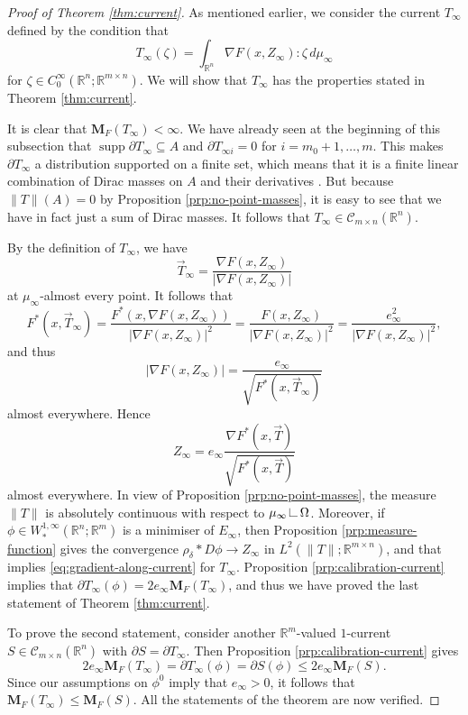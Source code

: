 \documentclass[a4paper]{article}
\newcommand{\R}{\mathbb{R}}
\newcommand{\M}{\mathbf{M}}
\newcommand{\grad}{\nabla}
\newcommand{\ncrt}{\mathcal{C}}
\DeclareMathOperator{\supp}{supp}
\newcommand{\restr}{\mathchoice
{\kern2pt\mbox{\vrule width 0.08ex height1.5ex depth0ex\kern-0.08ex\vrule width 1.5ex height.08ex depth0ex}\kern2pt}
{\kern2pt\mbox{\vrule width 0.08ex height1.5ex depth0ex\kern-0.08ex\vrule width 1.5ex height.08ex depth0ex}\kern2pt}
{\kern1.5pt\mbox{\vrule width 0.06ex height1.1ex depth0ex\kern-0.06ex\vrule width 1.1ex height.06ex depth0ex}\kern1.5pt}
{\kern1pt\mbox{\vrule width 0.04ex height0.75ex depth0ex\kern-0.04ex\vrule width 0.75ex height.04ex depth0ex}\kern1pt}
}
\theoremstyle{definition}
\theoremstyle{remark}
\begin{document}
\begin{proof}[Proof of Theorem \ref{thm:current}]
As mentioned earlier, we consider the current $T_\infty$ defined by the
condition that
\[
T_\infty(\zeta) = \int_{\R^n} \grad F(x, Z_\infty) : \zeta \, d\mu_\infty
\]
for $\zeta \in C_0^\infty(\R^n; \R^{m \times n})$. We will show that $T_\infty$
has the properties stated in Theorem \ref{thm:current}.

It is clear that $\M_F(T_\infty) < \infty$.
We have already seen at the beginning of this subsection that
$\supp \partial T_\infty \subseteq A$ and $\partial T_{\infty i} = 0$ for
$i = m_0 + 1, \dotsc, m$. This makes $\partial T_\infty$ a distribution
supported on a finite set, which means that it is a finite linear combination
of Dirac masses on $A$ and their derivatives \cite[Theorem 1.5.3]{Hoermander:64}.
But because $\|T\|(A) = 0$ by Proposition \ref{prp:no-point-masses}, it is easy to see that we have in fact
just a sum of Dirac masses. It follows that $T_\infty \in \ncrt_{m \times n}(\R^n)$.

By the definition of $T_\infty$, we have
\[
\vec{T}_\infty = \frac{\grad F(x, Z_\infty)}{|\grad F(x, Z_\infty)|}
\]
at $\mu_\infty$-almost every point. It follows that
\[
F^*(x, \vec{T}_\infty) = \frac{F^*(x, \grad F(x, Z_\infty))}{|\grad F(x, Z_\infty)|^2} = \frac{F(x, Z_\infty)}{|\grad F(x, Z_\infty)|^2} = \frac{e_\infty^2}{|\grad F(x, Z_\infty)|^2},
\]
and thus
\[
|\grad F(x, Z_\infty)| = \frac{e_\infty}{\sqrt{F^*(x, \vec{T}_\infty)}}
\]
almost everywhere. Hence
\[
Z_\infty = e_\infty \frac{\grad F^*(x, \vec{T})}{\sqrt{F^*(x, \vec{T})}}
\]
almost everywhere. In view of Proposition \ref{prp:no-point-masses}, the measure
$\|T\|$ is absolutely continuous with respect to $\mu_\infty \restr \Omega$. Moreover,
if $\phi \in W_*^{1, \infty}(\R^n; \R^m)$ is a minimiser of $E_\infty$, then
Proposition \ref{prp:measure-function} gives the convergence $\rho_\delta * D\phi \to Z_\infty$ in
$L^2(\|T\|; \R^{m \times n})$, and that implies
\eqref{eq:gradient-along-current} for $T_\infty$. Proposition \ref{prp:calibration-current}
implies that $\partial T_\infty(\phi) = 2 e_\infty \M_F(T_\infty)$, and thus we have
proved the last statement of Theorem \ref{thm:current}.

To prove the second statement, consider another $\R^m$-valued $1$-current $S \in \ncrt_{m \times n}(\R^n)$
with $\partial S = \partial T_\infty$. Then Proposition \ref{prp:calibration-current} gives
\[
2 e_\infty \M_F(T_\infty) = \partial T_\infty(\phi) = \partial S(\phi) \le 2 e_\infty \M_F(S).
\]
Since our assumptions on $\phi^0$ imply that $e_\infty > 0$, it follows that
$\M_F(T_\infty) \le \M_F(S)$. All the statements of the theorem are now verified.
\end{proof}
\end{document}
